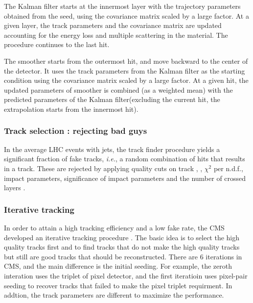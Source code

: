 The Kalman filter starts at the innermost layer with the trajectory 
parameters obtained from the seed, using the covariance matrix scaled 
by a large factor.  
At a given layer, the track parameters and the covariance matrix are updated
accounting for the energy loss and multiple scattering in the material.
The procedure continues to the last hit.

The smoother starts from the outermost hit, 
and move backward to the center of the detector. 
It uses the track parameters from the Kalman filter as the starting condition 
using the covariance matrix scaled by a large factor. 
At a given hit, the updated parameters of smoother is combined (as a weighted mean) 
with the predicted parameters of the Kalman filter(excluding the current hit, 
the extrapolation starts from the innermost hit).

\subsubsection{Track selection : rejecting bad guys }

In the average LHC events with jets, the track finder procedure yields 
a significant fraction of fake tracks, \textit{i.e.}, a random combination 
of hits that results in a track. These are rejected by applying 
quality cuts on track \Eta, \pt, $\chi^2$ per n.d.f., impact parameters,
significance of impact parameters
and the number of crossed layers \cite{cmsnotetrackfilter}. 

\subsubsection{Iterative tracking}

In order to attain a high tracking efficiency and a low fake rate, 
the CMS developed an iterative tracking procedure \cite{cmsnoteiterativetracking}. 
The basic idea is to select the high quality tracks first and 
to find tracks that do not make the high quality tracks 
but still are good tracks that should be reconstructed. 
There are 6 iterations in CMS, and the main difference is 
the initial seeding. For example, the zeroth interation uses 
the triplet of pixel detector, and the first iteratioin uses 
pixel-pair seeding to recover tracks that failed to make 
the pixel triplet requirment. In addtion, the track parameters 
are different to maximize the performance.


